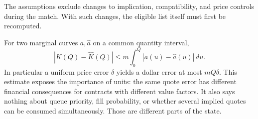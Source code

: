 The assumptions exclude changes to implication, compatibility, and price controls during the match. With such changes, the eligible list itself must first be recomputed.

For two marginal curves $a,\widehat a$ on a common quantity interval,
\begin{equation}
 |K(Q)-\widehat K(Q)|
 \le m\int_0^Q|a(u)-\widehat a(u)|\,du.
\label{eq:depthbound}
\end{equation}
In particular a uniform price error $\delta$ yields a dollar error at most $mQ\delta$. This estimate exposes the importance of units: the same quote error has different financial consequences for contracts with different value factors. It also says nothing about queue priority, fill probability, or whether several implied quotes can be consumed simultaneously. Those are different parts of the state.
\FloatBarrier
